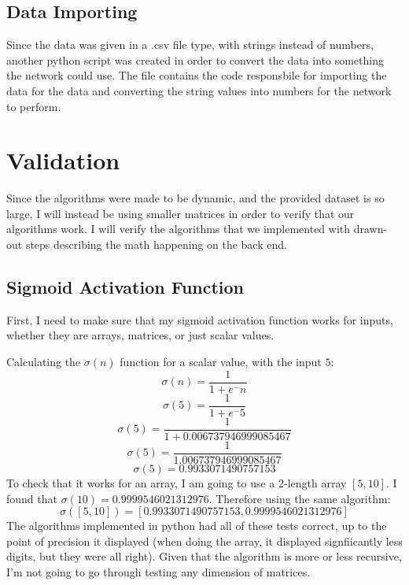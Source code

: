 \documentclass[10pt]{article}
\begin{document}
\subsection{Data Importing}
Since the data was given in a .csv file type, with strings instead of numbers, another python script was created in order to convert the data into something the network could use. The file  contains the code responsbile for importing the data for the data and converting the string values into numbers for the network to perform.
\newpage
\section{Validation}
Since the algorithms were made to be dynamic, and the provided dataset is so large, I will instead be using smaller matrices in order to verify that our algorithms work. I will verify the algorithms that we implemented with drawn-out steps describing the math happening on the back end.
\subsection{Sigmoid Activation Function}
First, I need to make sure that my sigmoid activation function works for inputs, whether they are arrays, matrices, or just scalar values.\par
Calculating the $\sigma(n)$ function for a scalar value, with the input $5$:
$$\sigma(n) = \frac{1}{1 + e^-n}$$
$$\sigma(5) = \frac{1}{1 + e^-5}$$
$$\sigma(5) = \frac{1}{1 + 0.006737946999085467}$$
$$\sigma(5) = \frac{1}{1.006737946999085467}$$
$$\sigma(5) = 0.9933071490757153$$
To check that it works for an array, I am going to use a 2-length array $[5,10]$. I found that $\sigma(10) = 0.9999546021312976$. Therefore using the same algorithm:
$$\sigma([5,10]) = [0.9933071490757153,0.9999546021312976]$$
The algorithms implemented in python had all of these tests correct, up to the point of precision it displayed (when doing the array, it displayed signfiicantly less digits, but they were all right). Given that the algorithm is more or less recursive, I'm not going to go through testing any dimension of matrices.
\end{document}
